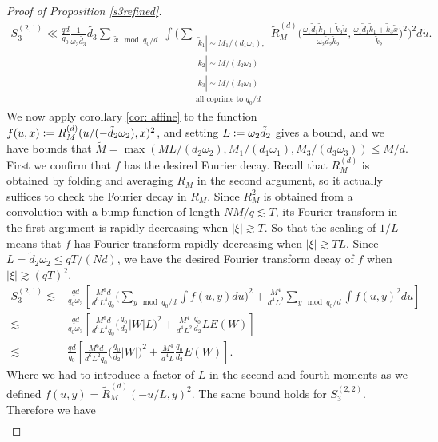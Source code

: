 \begin{proof}[Proof of Proposition \ref{s3refined}]
    \begin{align*}
        S_3^{(2,1)}\ll
        \frac{qd}{q_0} \frac{1}{\omega_3\tilde{d_3}}\tilde{d_3} \sum_{\substack{\tilde{x} \mod q_0/d} }\int\Bigg(\sum_{\substack{|\tilde{k}_1|\sim M_1/(d_1\omega_1),\\|\tilde{k}_2|\sim M/(d_2\omega_2)\\|\tilde{k}_3|\sim M/(d_3\omega_3)\\
        \textrm{all coprime to $q_0/d$}}}
        \tilde{R}_M^{(d)}\Big(\frac{\omega_1\tilde{d}_1\tilde{k}_1+\tilde{k}_3\tilde{u}}{-\omega_2\tilde{d}_2\tilde{k}_2},\frac{\omega_1\tilde{d}_1\tilde{k}_1+\tilde{k}_3 \tilde{x}}{-\tilde{k}_2}\Big)^2\Bigg)^2 d\tilde{u}.
    \end{align*}
    We now apply corollary \ref{cor: affine} to the function $f(u,x)\mathrel{\mathop:}= R_M^{(d)}(u/(-\tilde{d}_2\omega_2),x)^2$, and setting $L\mathrel{\mathop:}=\omega_2\tilde{d}_2$ gives a bound, and we have bounds that $\tilde{M} = \max(ML/(d_2\omega_2) ,M_1/(d_1\omega_1),M_3/(d_3\omega_3))\leq M/d $. First we confirm that $f$ has the desired Fourier decay.
    Recall that $R_M^{(d)}$ is obtained by folding and averaging $R_M$ in the second argument, so it actually suffices to check the Fourier decay in $R_M$.
    Since $R_M^2$ is obtained from a convolution with a bump function of length $NM/q\lesssim T$, its Fourier transform in the first argument is rapidly decreasing when
    $|\xi|\gtrsim T$. So that the scaling of $1/L$ means that $f$ has Fourier transform rapidly decreasing when $|\xi|\gtrsim TL$. Since $L=\tilde{d}_2\omega_2\leq qT/(Nd)$, we 
    have the desired Fourier transform decay of $f$ when $|\xi|\gtrsim (qT)^2$.
    \begin{align*}
        S_3^{(2,1)}\lesssim &  \frac{qd}{q_0\omega_3}\left[\frac{M^6d}{d^6L^4q_0}\Big(\sum_{y \mod q_0/d } \int f(u,y) du\Big)^2  + \frac{M^4}{d^4L^2}\sum_{y\mod q_0/d} \int f(u,y)^2 du
        \right]\\
        \lesssim& \frac{qd}{q_0\omega_3}\left[\frac{M^6d}{d^6L^4q_0}\Big(\frac{q_0}{d_2}|W|L)^2  + \frac{M^4}{d^4L^2}\frac{q_0}{d_2}LE(W)
        \right]\\
        \lesssim & \frac{qd}{q_0}\left[\frac{M^6d}{d^6L^2q_0}\Big(\frac{q_0}{d_2}|W|)^2  + \frac{M^4}{d^4L}\frac{q_0}{d_2}E(W)\right].
    \end{align*}
    Where we had to introduce a factor of $L$ in the second and fourth moments as we defined $f(u,y) = \tilde{R}_M^{(d)}(-u/L,y)^2$. 
    The same bound holds for $S^{(2,2)}_3$.
    Therefore we have \begin{align*}

\end{align*}
\end{proof}

